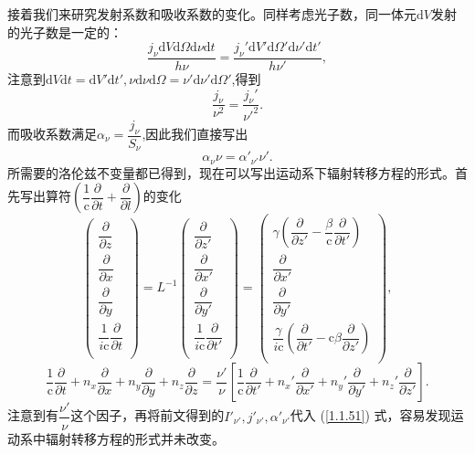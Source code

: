 \documentclass[../天体物理基础.tex]{subfiles}
\begin{document}
接着我们来研究发射系数和吸收系数的变化。同样考虑光子数，同一体元$\mathrm{d}V$发射的光子数是一定的：
\begin{equation}
\frac{j_\nu\mathrm{d}V\mathrm{d}\Omega\mathrm{d}\nu\mathrm{d}t}{h\nu}=\frac{j_\nu'\mathrm{d}V'\mathrm{d}\Omega'\mathrm{d}\nu'\mathrm{d}t'}{h\nu'},
\end{equation}
注意到$\mathrm{d}V\mathrm{d}t=\mathrm{d}V'\mathrm{d}t',\nu\mathrm{d}\nu\mathrm{d}\Omega=\nu'\mathrm{d}\nu'\mathrm{d}\Omega'$,得到
\begin{equation}
\frac{j_\nu}{\nu^2}=\frac{j_\nu'}{\nu'^2}.
\end{equation}
而吸收系数满足$\alpha_{\nu}=\dfrac{j_{\nu}}{S_{\nu}}$,因此我们直接写出
\begin{equation}
\alpha_{\nu}\nu=\alpha'_{\nu'}\nu'.
\end{equation}
所需要的洛伦兹不变量都已得到，现在可以写出运动系下辐射转移方程的形式。首先写出算符$\left(\dfrac{1}{\mathrm{c}}\dfrac{\partial{}}{\partial{}t}+\dfrac{\partial{}}{\partial{}l}\right)$的变化
\begin{equation}
\begin{pmatrix}
\dfrac{\partial}{\partial z}\\
\dfrac{\partial}{\partial x}\\
\dfrac{\partial}{\partial y}\\
\dfrac1{i\mathrm{c}}\dfrac{\partial}{\partial t}\\
\end{pmatrix}
=L^{-1}
\begin{pmatrix}
\dfrac{\partial}{\partial z'}\\
\dfrac{\partial}{\partial x'}\\
\dfrac{\partial}{\partial y'}\\
\dfrac1{i\mathrm{c}}\dfrac{\partial}{\partial t'}\\
\end{pmatrix}
=\begin{pmatrix}
\gamma(\dfrac{\partial}{\partial z'}-\dfrac{\beta}{\mathrm{c}}\dfrac{\partial}{\partial t'})\\
\dfrac{\partial}{\partial x'}\\
\dfrac{\partial}{\partial y'}\\
\dfrac\gamma{i\mathrm{c}}(\dfrac{\partial}{\partial t'}-\mathrm{c}\beta\dfrac{\partial}{\partial z'})\\
\end{pmatrix},
\end{equation}
\begin{equation}
\frac{1}{\mathrm{c}}\frac{\partial }{\partial t}+n_{x}\frac{\partial}{\partial x}+n_{y}\frac{\partial}{\partial y}+n_{z}\frac{\partial}{\partial z}=\frac{\nu'}{\nu}\left[\frac{1}{\mathrm{c}}\frac{\partial}{\partial t'}+n_{x}'\frac{\partial}{\partial x'}+n_{y}'\frac{\partial}{\partial y'}+n_{z}'\frac{\partial}{\partial z'}\right].
\end{equation}
注意到有$\dfrac{\nu'}{\nu}$这个因子，再将前文得到的$I'_{\nu'},j'_{\nu'},\alpha'_{\nu'}$代入 (\ref{1.1.51}) 式，容易发现运动系中辐射转移方程的形式并未改变。
\end{document}
